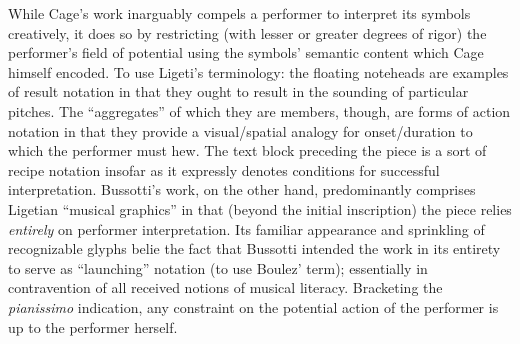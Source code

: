     While Cage's work inarguably compels a performer to interpret its symbols creatively, it does so by restricting (with lesser or greater degrees of rigor) the performer's field of potential using the symbols' semantic content which Cage himself encoded. To use Ligeti's terminology: the floating noteheads are examples of result notation in that they ought to result in the sounding of particular pitches.  The ``aggregates'' of which they are members, though, are forms of action notation in that they provide a visual/spatial analogy for onset/duration to which the performer must hew. The text block preceding the piece is a sort of recipe notation insofar as it expressly denotes conditions for successful interpretation. Bussotti's work, on the other hand, predominantly comprises Ligetian ``musical graphics'' in that (beyond the initial inscription) the piece relies \textit{entirely} on performer interpretation. Its familiar appearance and sprinkling of recognizable glyphs belie the fact that Bussotti intended the work in its entirety to serve as ``launching'' notation (to use Boulez' term); essentially in contravention of all received notions of musical literacy. Bracketing the \textit{pianissimo} indication, any constraint on the potential action of the performer is up to the performer herself.

